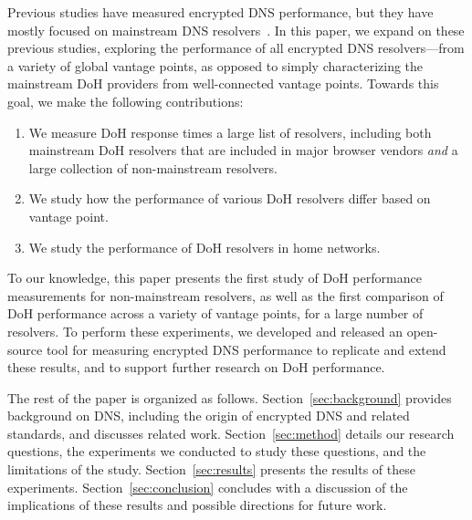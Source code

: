 Previous studies have measured encrypted DNS performance, but they have mostly focused on mainstream DNS resolvers~\cite{hounsel2020comparing,hounsel2021can,hoang2020k,lu2019end-to-end}.
In this paper, we expand on these previous studies, exploring the performance
of all encrypted DNS resolvers---from a variety of global 
vantage points, as opposed to simply characterizing the mainstream DoH
providers from well-connected vantage points.
Towards this goal, we make the following contributions:
\begin{enumerate}
    \itemsep=-1pt
    \item We measure DoH response times a large list of resolvers, including
        both mainstream DoH resolvers that are included in major browser
        vendors {\em and} a large collection of non-mainstream resolvers.
    \item We study how the performance of various DoH resolvers differ based
        on vantage point.
    \item We study the performance of DoH resolvers in home networks. 
\end{enumerate}
\noindent
To our knowledge, this paper presents the first study of DoH performance
measurements for non-mainstream resolvers, as well as the first comparison of
DoH performance across a variety of vantage points, for a large number of
resolvers.
To perform these experiments, we developed and released an open-source
tool for measuring encrypted DNS performance to replicate and extend these
results, and to support further research on DoH performance.

The rest of the paper is organized as follows.  Section~\ref{sec:background}
provides background on DNS, including the origin of encrypted DNS and related
standards, and discusses related work.  Section~\ref{sec:method} details our research questions, the
experiments we conducted to study these questions, and the limitations of the
study.  Section~\ref{sec:results} presents the results of these experiments.
Section~\ref{sec:conclusion} concludes with a discussion of the implications
of these results and possible directions for future work. 

